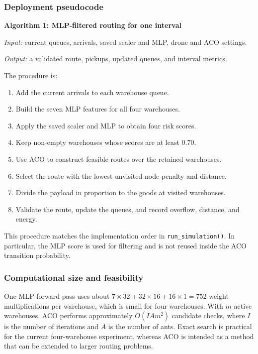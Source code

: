 \documentclass[10pt]{article}
\newcommand{\code}[1]{\nolinkurl{#1}}
\begin{document}
\subsubsection{Deployment pseudocode}

\textbf{Algorithm 1: MLP-filtered routing for one interval}\par
\textit{Input:} current queues, arrivals, saved scaler and MLP, drone and ACO settings.\par
\textit{Output:} a validated route, pickups, updated queues, and interval metrics.

The procedure is:

\begin{enumerate}
  \item Add the current arrivals to each warehouse queue.
  \item Build the seven MLP features for all four warehouses.
  \item Apply the saved scaler and MLP to obtain four risk scores.
  \item Keep non-empty warehouses whose scores are at least 0.70.
  \item Use ACO to construct feasible routes over the retained warehouses.
  \item Select the route with the lowest unvisited-node penalty and distance.
  \item Divide the payload in proportion to the goods at visited warehouses.
  \item Validate the route, update the queues, and record overflow, distance, and energy.
\end{enumerate}

This procedure matches the implementation order in \code{run_simulation()}. In particular, the MLP score is used for filtering and is not reused inside the ACO transition probability.

\subsubsection{Computational size and feasibility}

One MLP forward pass uses about $7\times32+32\times16+16\times1=752$ weight multiplications per warehouse, which is small for four warehouses. With $m$ active warehouses, ACO performs approximately $O(IAm^2)$ candidate checks, where $I$ is the number of iterations and $A$ is the number of ants. Exact search is practical for the current four-warehouse experiment, whereas ACO is intended as a method that can be extended to larger routing problems.
\end{document}
